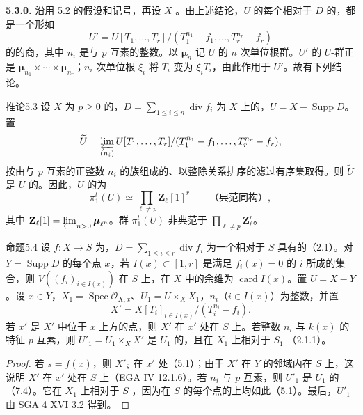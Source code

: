 \textbf{5.3.0.} 沿用 5.2 的假设和记号，再设 $X$ 。由上述结论，$U$ 的每个相对于 $D$ 的，都是一个形如
\[U'=U[T_1,\ldots,T_r]/(T_1^{n_1}-f_1,\ldots,T_r^{n_r}-f_r)\]
的的商，其中 $n_i$ 是与 $p$ 互素的整数。以 $\boldsymbol\mu_n$ 记 $U$ 的 $n$ 次单位根群。$U'$ 的 $U$-群正是 $\boldsymbol\mu_{n_1}\times\cdots\times\boldsymbol\mu_{n_r}$；$n_i$ 次单位根 $\xi_i$ 将 $T_i$ 变为 $\xi_iT_i$，由此作用于 $U'$。故有下列结论。

\begin{SGAresult}{推论}{5.3}
设 $X$ 为 $p\geq0$ 的，$D=\sum_{1\leq i\leq n}\operatorname{div}f_i$ 为 $X$ 上的，$U=X-\operatorname{Supp}D$。置
\[\widetilde U=\varprojlim_{(n_i)}U[T_1,\ldots,T_r]/(T_1^{n_1}-f_1,\ldots,T_r^{n_r}-f_r),\]
按由与 $p$ 互素的正整数 $n_i$ 的族组成的、以整除关系排序的滤过有序集取得。则 $\widetilde U$ 是 $U$ 的。因此，$U$ 的为
\[\pi_1^t(U)\simeq\prod_{\ell\ne p}\mathbf Z_\ell[1]^r\qquad\text{（典范同构）},\]
其中 $\mathbf Z_\ell[1]=\varprojlim_{n>0}\boldsymbol\mu_{\ell^n}$。群 $\pi_1^t(U)$ 非典范于 $\prod_{\ell\ne p}\mathbf Z_\ell^r$。
\end{SGAresult}

\begin{SGAresult}{命题}{5.4}
设 $f:X\to S$ 为，$D=\sum_{1\leq i\leq r}\operatorname{div}f_i$ 为一个相对于 $S$ 具有的（2.1）。对 $Y=\operatorname{Supp}D$ 的每个点 $x$，若 $I(x)\subset[1,r]$ 是满足 $f_i(x)=0$ 的 $i$ 所成的集合，则 $V((f_i)_{i\in I(x)})$ 在 $S$ 上，在 $X$ 中的余维为 $\operatorname{card}I(x)$。置 $U=X-Y$。设 $x\in Y$，$X_1=\operatorname{Spec}\mathcal O_{X,x}$、$U_1=U\times_X X_1$，$n_i$（$i\in I(x)$）为整数，并置
\[X'=X[T_i]_{i\in I(x)}/(T_i^{n_i}-f_i).\]
若 $x'$ 是 $X'$ 中位于 $x$ 上方的点，则 $X'$ 在 $x'$ 处在 $S$ 上。若整数 $n_i$ 与 $k(x)$ 的特征 $p$ 互素，则 $U'_1=U_1\times_X X'$ 是 $U_1$ 的，且在 $X_1$ 上相对于 $S_1$ （2.1.1）。
\end{SGAresult}
\begin{proof}
若 $s=f(x)$，则 $X'_{\bar s}$ 在 $x'$ 处（5.1）；由于 $X'$ 在 $Y$ 的邻域内在 $S$ 上，这说明 $X'$ 在 $x'$ 处在 $S$ 上（EGA IV 12.1.6）。若 $n_i$ 与 $p$ 互素，则 $U'_1$ 是 $U_1$ 的（7.4）。它在 $X_1$ 上相对于 $S$ ，因为在 $S$ 的每个点的上均如此（5.1）。最后，$U'_1$ 由 SGA 4 XVI 3.2 得到。
\end{proof}

